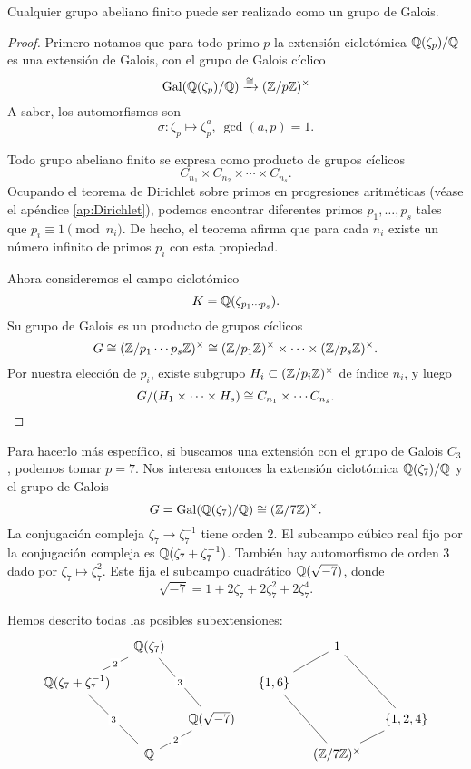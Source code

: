 \begin{proposicion}
  Cualquier grupo abeliano finito puede ser realizado como un grupo de Galois.

  \begin{proof}
    Primero notamos que para todo primo $p$ la extensión ciclotómica
    $\mathbb{Q} (\zeta_p)/\mathbb{Q}$ es una extensión de Galois, con el grupo de Galois
    cíclico
    $$\operatorname{Gal} (\mathbb{Q} (\zeta_p)/\mathbb{Q}) \xrightarrow{\cong} (\mathbb{Z}/p\mathbb{Z})^\times$$
    A saber, los automorfismos son
    $$\sigma\colon \zeta_p \mapsto \zeta_p^a, ~ \gcd (a,p) = 1.$$

    Todo grupo abeliano finito se expresa como producto de grupos cíclicos
    $$C_{n_1} \times C_{n_2} \times \cdots \times C_{n_s}.$$
    Ocupando el teorema de Dirichlet sobre primos en progresiones aritméticas
    (véase el apéndice \ref{ap:Dirichlet}), podemos encontrar diferentes primos
    $p_1,\ldots,p_s$ tales que $p_i \equiv 1 \pmod{n_i}$. De hecho, el teorema
    afirma que para cada $n_i$ existe un número infinito de primos $p_i$ con
    esta propiedad.

    Ahora consideremos el campo ciclotómico
    $$K = \mathbb{Q} (\zeta_{p_1\cdots p_s}).$$
    Su grupo de Galois es un producto de grupos cíclicos
    \[ G \cong (\mathbb{Z}/p_1\cdots p_s\mathbb{Z})^\times
       \cong (\mathbb{Z}/p_1\mathbb{Z})^\times \times \cdots \times (\mathbb{Z}/p_s\mathbb{Z})^\times. \]
    Por nuestra elección de $p_i$, existe subgrupo
    $H_i \subset (\mathbb{Z}/p_i\mathbb{Z})^\times$ de índice $n_i$, y luego
    \[ G/(H_1\times \cdots \times H_s) \cong C_{n_1} \times \cdots C_{n_s}. \qedhere \]
  \end{proof}
\end{proposicion}

\begin{ejemplo}
  Para hacerlo más específico, si buscamos una extensión con el grupo de Galois
  $C_3$, podemos tomar $p = 7$. Nos interesa entonces la extensión ciclotómica
  $\mathbb{Q} (\zeta_7)/\mathbb{Q}$ y el grupo de Galois
  $$G = \operatorname{Gal} (\mathbb{Q} (\zeta_7)/\mathbb{Q}) \cong (\mathbb{Z}/7\mathbb{Z})^\times.$$
  La conjugación compleja $\zeta_7 \to \zeta_7^{-1}$ tiene orden $2$.
  El subcampo cúbico real fijo por la conjugación compleja es
  $\mathbb{Q} (\zeta_7 + \zeta_7^{-1})$.
  También hay automorfismo de orden $3$ dado por $\zeta_7 \mapsto \zeta_7^2$.
  Este fija el subcampo cuadrático $\mathbb{Q} (\sqrt{-7})$, donde
  $$\sqrt{-7} = 1 + 2\zeta_7 + 2\zeta_7^2 + 2\zeta_7^4.$$

  Hemos descrito todas las posibles subextensiones:
  \[ \begin{tikzcd}[row sep=1em,column sep=1em]
    & \QQ (\zeta_7)\ar[-]{dl}[description]{2}\ar[-]{ddr}[description]{3} & & & 1\ar[-]{dl}\ar[-]{ddr} \\
    \QQ (\zeta_7 + \zeta_7^{-1})\ar[-]{ddr}[description]{3} & & & \{ 1, 6 \}\ar[-]{ddr} \\
    & & \QQ (\sqrt{-7}) \ar[-]{dl}[description]{2} & & & \{ 1,2,4 \}\ar[-]{dl} \\
     & \QQ & & & (\ZZ/7\ZZ)^\times
    \end{tikzcd} \]
\end{ejemplo}

